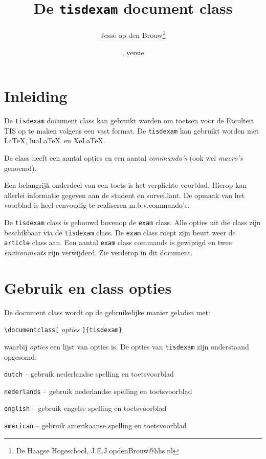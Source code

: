 \documentclass[12pt,dutch,addpoints,fleqn]{tisdexam}
\newcommand\DocClass[1]{\texttt{#1}}
\newcommand\Option[1]{\texttt{#1}}
\begin{document}
\raggedbottom
\title{De \DocClass{tisdexam} document class}
\author{Jesse op den Brouw\thanks{De Haagse Hogeschool,
        {J.E.J.opdenBrouw@hhs.nl}}}
\date{\tisdexamfiledate, versie \tisdexamfileversion}
\maketitle
\setcounter{footnote}{1}


\section{Inleiding}
\label{sec:abstract}
De \DocClass{tisdexam} document class kan gebruikt worden om toetsen voor
de Faculteit TIS op te maken volgens een vast format. De \DocClass{tisdexam}
kan gebruikt worden met \LaTeX, lua\LaTeX\ en Xe\LaTeX.

De class heeft een aantal opties en een aantal \textsl{commando's} (ook wel
\textsl{macro's} genoemd).

Een belangrijk onderdeel van een toets is het verplichte voorblad. Hierop kan
allerlei informatie gegeven aan de student en surveillant. De opmaak van het
voorblad is heel eenvoudig te realiseren m.b.v.\@ commando's.

De \DocClass{tisdexam} class is gebouwd bovenop de \DocClass{exam}
class. Alle opties uit die class zijn beschikbaar via de
\DocClass{tisdexam} class. De \DocClass{exam} class roept zijn
beurt weer de \DocClass{article} class aan.
Een aantal \DocClass{exam} class commands is gewijzigd en twee
\textsl{environments} zijn verwijderd. Zie verderop in dit document.


\section{Gebruik en class opties}
De document class wordt op de gebruikelijke manier geladen met:

\verb|\documentclass[| \textsl{opties} \verb|]{tisdexam}|

waarbij \textsl{opties} een lijst van opties is. De opties van \DocClass{tisdexam} zijn
onderstaand opgesomd:

\Option{dutch} -- gebruik nederlandse spelling en toetsvoorblad

\Option{nederlands} -- gebruik nederlandse spelling  en toetsvoorblad

\Option{english} -- gebruik engelse spelling en toetsvoorblad

\Option{american} -- gebruik amerikaanse spelling en toetsvoorblad
\end{document}
